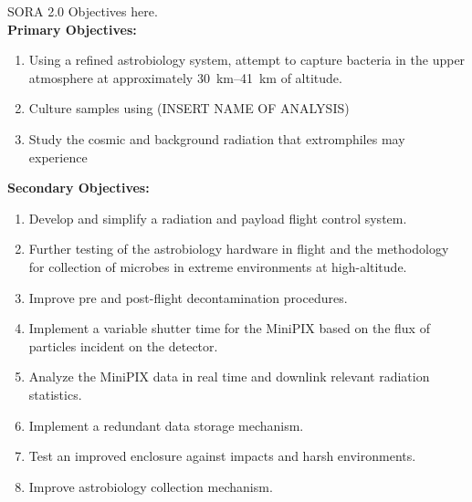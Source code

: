 SORA 2.0 Objectives here.\\
{\bf Primary Objectives:}
	\begin{enumerate}
	\item Using a refined astrobiology system, attempt to capture bacteria in the upper atmosphere at approximately \SIrange{30}{41}{\kilo\meter} of altitude.
%	
%
	\item Culture samples using (INSERT NAME OF ANALYSIS)
	\item Study the cosmic and background radiation that extromphiles may experience
	\end{enumerate}
%
%
{\bf Secondary Objectives:}
	\begin{enumerate}
	\item Develop and simplify a radiation and payload flight control system.
	\item Further testing of the astrobiology hardware in flight and the methodology for collection of microbes in extreme environments at high-altitude. 
	\item Improve pre and post-flight decontamination procedures.
	\item Implement a variable shutter time for the MiniPIX based on the flux of particles incident on the detector.
	\item Analyze the MiniPIX data in real time and downlink relevant radiation statistics.
	\item Implement a redundant data storage mechanism.
	\item Test an improved enclosure against impacts and harsh environments.
	\item Improve astrobiology collection mechanism.
	
	\end{enumerate}

 
